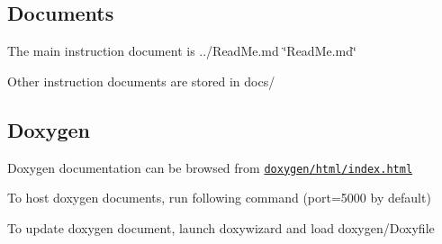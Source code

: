 \subsection*{Documents}


\begin{DoxyItemize}
\item The main instruction document is ../\+Read\+Me.md \char`\"{}\+Read\+Me.\+md\char`\"{}
\item Other instruction documents are stored in docs/
\end{DoxyItemize}

\subsection*{Doxygen}


\begin{DoxyItemize}
\item Doxygen documentation can be browsed from \href{../doxygen/html/index.html}{\tt doxygen/html/index.\+html}
\item To host doxygen documents, run following command (port=5000 by default) 

\item To update doxygen document, launch doxywizard and load doxygen/\+Doxyfile 
\end{DoxyItemize}